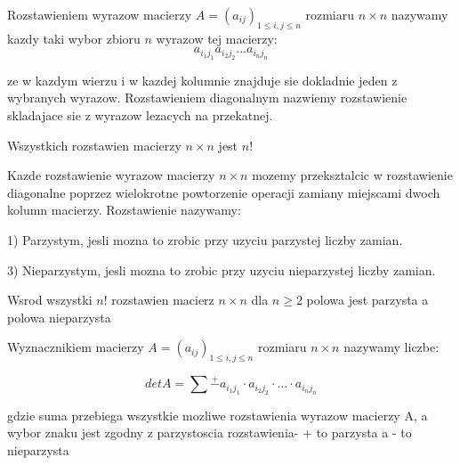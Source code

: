 \documentclass{article}
\begin{document}
\vspace{10mm}

\begin{tcolorbox}[colback=white!90!green,colframe=black!35!green,title=Definicja 2.1 Rozstawienie wyrazow macierzy]

Rozstawieniem wyrazow macierzy $A=(a_{ij})_{1\leq i,j \leq n}$ rozmiaru $n \times n$ nazywamy kazdy taki wybor zbioru $n$ wyrazow tej macierzy:
$$a_{i_{1}j_{1}} a_{i_{2}j_{2}} ... a_{i_{n}j_{n}}$$

ze w kazdym wierzu i w kazdej kolumnie znajduje sie dokladnie jeden z wybranych wyrazow. 
Rozstawieniem diagonalnym nazwiemy rozstawienie skladajace sie z wyrazow lezacych na przekatnej.

\end{tcolorbox}

\begin{tcolorbox}[colback=white!90!red,colframe=black!35!red,title=Fakt 2.2-2.4 Liczba parzystosc i liczba (nie)parzystych rozstawien]

Wszystkich rozstawien macierzy $n \times n$ jest $n!$


Kazde rozstawienie wyrazow macierzy $n \times n$ mozemy przeksztalcic w rozstawienie diagonalne poprzez wielokrotne powtorzenie operacji zamiany miejscami dwoch kolumn macierzy. Rozstawienie nazywamy:

1) Parzystym, jesli mozna to zrobic przy uzyciu parzystej liczby zamian.

3) Nieparzystym, jesli mozna to zrobic przy uzyciu nieparzystej liczby zamian.

Wsrod wszystki $n!$ rozstawien macierz $n \times n$ dla $n \geq 2$ polowa jest parzysta a polowa nieparzysta


\end{tcolorbox}

\begin{tcolorbox}[colback=white!90!red,colframe=black!35!red,title=Definicja 2.5 Wyznacznik macierzy]

Wyznacznikiem macierzy  $A=(a_{ij})_{1\leq i,j \leq n}$ rozmiaru $n \times n$ nazywamy liczbe:

$$detA = \sum \overset{+}{-} a_{i_{1}j_{1}} \cdot a_{i_{2}j_{2}} \cdot ... \cdot a_{i_{n}j_{n}}$$

gdzie suma przebiega wszystkie mozliwe rozstawienia wyrazow macierzy A, a wybor znaku jest zgodny z parzystoscia rozstawienia- + to parzysta a - to nieparzysta 

\end{tcolorbox}
\end{document}
